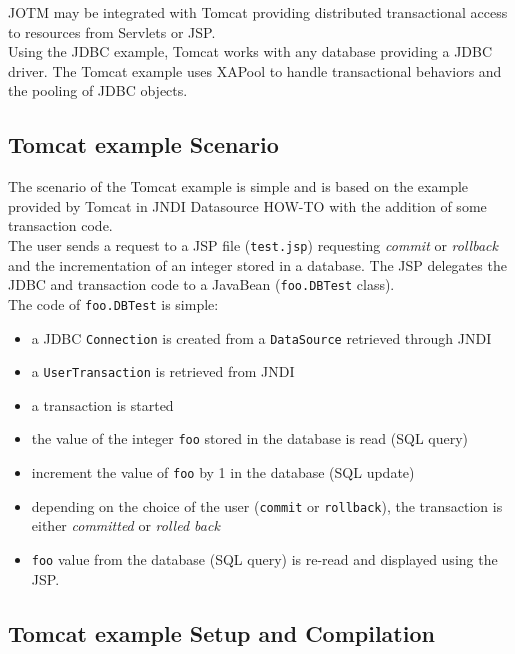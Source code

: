 \documentclass[a4paper,11pt]{article}
\begin{document}
JOTM may be integrated with Tomcat providing distributed transactional access
 to resources from Servlets or JSP. \\
\noindent Using the JDBC example, Tomcat works with any database providing a JDBC driver.
The Tomcat example uses XAPool to handle transactional behaviors and the 
pooling of JDBC objects.

\subsection{Tomcat example Scenario}
\label{sec:tomcat_scenario}

The scenario of the Tomcat example is simple and is based on the example
provided by Tomcat in JNDI Datasource HOW-TO with the addition of some 
transaction code.\\

\noindent The user sends a request to a JSP file (\texttt{test.jsp}) requesting 
\emph{commit} or \emph{rollback} and the incrementation of an integer stored in
 a database.
The JSP delegates the JDBC and transaction code to a JavaBean
(\texttt{foo.DBTest} class).\\

\noindent The code of \texttt{foo.DBTest} is simple:
\begin{itemize}
\item a JDBC \texttt{Connection} is created from a \texttt{DataSource} retrieved through JNDI
\item a \texttt{UserTransaction} is retrieved from JNDI
\item a transaction is started
\item the value of the integer \texttt{foo} stored in the
  database is read (SQL query)
\item increment the value of \texttt{foo} by 1 in the database (SQL
  update)
\item depending on the choice of the user (\texttt{commit} or
  \texttt{rollback}), the transaction is either \emph{committed} or
  \emph{rolled back}
\item \texttt{foo} value from the database (SQL
  query) is re-read and displayed using the JSP.
\end{itemize}

\subsection{Tomcat example Setup and Compilation}
\label{sec:tomcat_setup}
\end{document}
